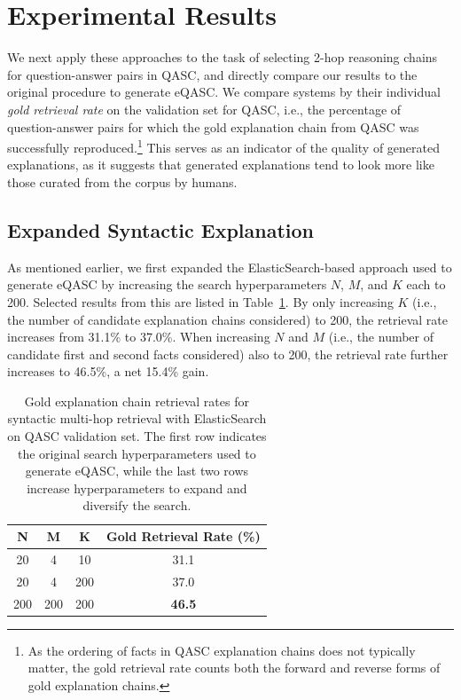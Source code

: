 \documentclass[letterpaper]{article} %
\begin{document}
\section{Experimental Results}
We next apply these approaches to the task of selecting 2-hop reasoning chains for question-answer pairs in QASC, and directly compare our results to the original procedure to generate eQASC. We compare systems by their individual \textit{gold retrieval rate} on the validation set for QASC, i.e., the percentage of question-answer pairs for which the gold explanation chain from QASC was successfully reproduced.\footnote{As the ordering of facts in QASC explanation chains does not typically matter, the gold retrieval rate counts both the forward and reverse forms of gold explanation chains.} This serves as an indicator of the quality of generated explanations, as it suggests that generated explanations tend to look more like those curated from the corpus by humans.

\subsection{Expanded Syntactic Explanation}
As mentioned earlier, we first expanded the ElasticSearch-based approach used to generate eQASC by increasing the search hyperparameters $N$, $M$, and $K$ each to 200. Selected results from this are listed in Table~\ref{tab:expand syntactic}. By only increasing $K$ (i.e., the number of candidate explanation chains considered) to 200, the retrieval rate increases from 31.1\% to 37.0\%. When increasing $N$ and $M$ (i.e., the number of candidate first and second facts considered) also to 200, the retrieval rate further increases to 46.5\%, a net 15.4\% gain.

\begin{table}
    \centering
    \footnotesize
    \begin{tabular}{ccc|c}
        \toprule
        \textbf{N} & \textbf{M} & \textbf{K} & \textbf{Gold Retrieval Rate (\%)} \\\midrule
        20 & 4 & 10 & 31.1 \\
        20 & 4 & 200 & 37.0 \\
        200 & 200 & 200 & \textbf{46.5} \\
        \bottomrule
    \end{tabular}
    \normalsize
    \caption{Gold explanation chain retrieval rates for syntactic multi-hop retrieval with ElasticSearch on QASC validation set. The first row indicates the original search hyperparameters used to generate eQASC, while the last two rows increase hyperparameters to expand and diversify the search.}
    \vspace{-1em}
    \label{tab:expand syntactic}
\end{table}
\end{document}
